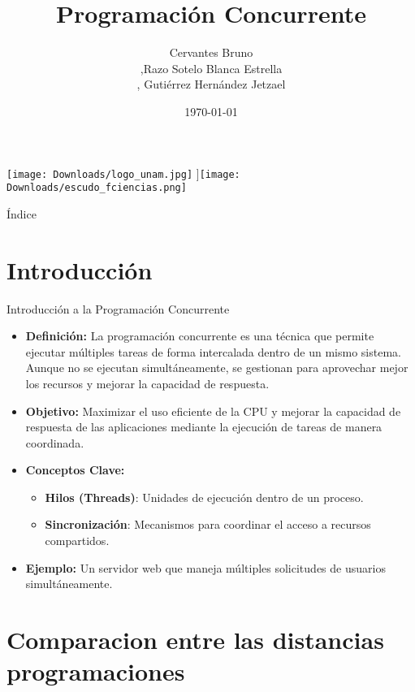 \documentclass{beamer}
\title[\insertframenumber/\inserttotalframenumber]{ \bf Programación Concurrente }
\author{Cervantes Bruno\\ ,Razo Sotelo Blanca Estrella\\, Gutiérrez Hernández Jetzael\\}
\institute{Facultad de Ciencias, UNAM}
\date{\today}
\begin{document}
\begin{frame}[plain] 
\titlepage
\begin{center}
\texttt{[image: Downloads/logo\_unam.jpg]} 
  \hspace{8cm}]{\texttt{[image: Downloads/escudo\_fciencias.png]} }    
\end{center}
\end{frame}


\begin{frame}{Índice}
  \tableofcontents
\end{frame}
\section{Introducción }
\begin{frame}{Introducción a la Programación Concurrente}
\begin{block}
    

    \begin{itemize}
        \item \textbf{Definición:} 
            La programación concurrente es una técnica que permite ejecutar múltiples tareas de forma intercalada dentro de un mismo sistema. Aunque no se ejecutan simultáneamente, se gestionan para aprovechar mejor los recursos y mejorar la capacidad de respuesta.\pause
        \item \textbf{Objetivo:} 
            Maximizar el uso eficiente de la CPU y mejorar la capacidad de respuesta de las aplicaciones mediante la ejecución de tareas de manera coordinada.\pause
        \item \textbf{Conceptos Clave:}
            \begin{itemize}
                \item \textbf{Hilos (Threads)}: Unidades de ejecución dentro de un proceso.
                \item \textbf{Sincronización}: Mecanismos para coordinar el acceso a recursos compartidos.\pause
            \end{itemize}
        \item \textbf{Ejemplo:} 
            Un servidor web que maneja múltiples solicitudes de usuarios simultáneamente.
    \end{itemize}
    \end{block}
\end{frame}


\section{Comparacion entre las distancias programaciones}
\end{document}
